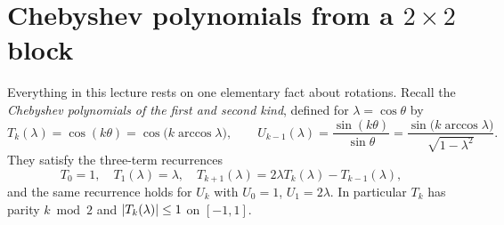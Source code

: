 \section{Chebyshev polynomials from a \texorpdfstring{$2\times2$}{2x2} block}
\label{sec:lec08-1}

Everything in this lecture rests on one elementary fact about rotations. Recall the
\emph{Chebyshev polynomials of the first and second kind}, defined for
$\lambda=\cos\theta$ by
\begin{equation}
  T_k(\lambda)=\cos(k\theta)=\cos\!\bigl(k\arccos\lambda\bigr),\qquad
  U_{k-1}(\lambda)=\frac{\sin(k\theta)}{\sin\theta}
   =\frac{\sin\!\bigl(k\arccos\lambda\bigr)}{\sqrt{1-\lambda^2}}.
  \label{eq:lec08-cheb}
\end{equation}
They satisfy the three-term recurrences
\begin{equation}
  T_0=1,\quad T_1(\lambda)=\lambda,\quad T_{k+1}(\lambda)=2\lambda T_k(\lambda)-T_{k-1}(\lambda),
  \label{eq:lec08-chebrec}
\end{equation}
and the same recurrence holds for $U_k$ with $U_0=1$, $U_1=2\lambda$. In particular
$T_k$ has parity $k\bmod2$ and $\left\lvert T_k(\lambda) \right\rvert\le1$ on $[-1,1]$.

